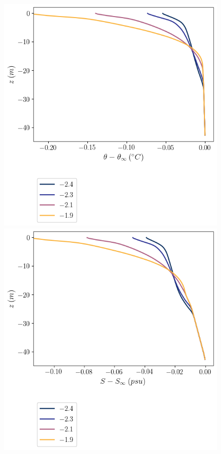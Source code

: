 \documentclass[draft]{styles/agujournal2019}
\begin{document}
\begin{figure}
    \centering
    \begin{minipage}{0.5\textwidth}
        \includegraphics[trim={0 4cm 0 0},clip, width=\textwidth]{Figures/ptfar_cmp_dT_40hr_tav1_z_profile.png}
    \end{minipage}%
    \begin{minipage}{0.5\textwidth}
        \includegraphics[trim={0 4cm 0 0},clip, width=\textwidth]{Figures/safar_cmp_dT_40hr_tav1_z_profile.png}

\end{minipage}
\end{figure}
\end{document}
